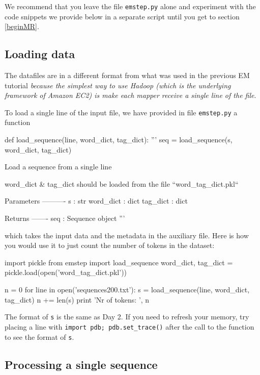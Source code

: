We recommend that you leave the file \verb+emstep.py+ alone and experiment with the code snippets we provide below in a separate script until you get to section \ref{beginMR}.

\subsection{Loading data}

The datafiles are in a different format from what was used in the previous EM
tutorial \emph{because the simplest way to use Hadoop (which is the underlying framework of Amazon EC2) is make each mapper
receive a single line of the file}.

To load a single line of the input file, we have provided in file {\texttt{emstep.py}} a function
\begin{python}
def load_sequence(line, word_dict, tag_dict):
    '''
    seq = load_sequence(s, word_dict, tag_dict)

    Load a sequence from a single line

    word_dict & tag_dict should be loaded from the file ``word_tag_dict.pkl``

    Parameters
    ----------
    s : str
    word_dict : dict
    tag_dict : dict

    Returns
    -------
    seq : Sequence object
    '''
\end{python}
which takes the
input data and the metadata in the auxiliary file. Here is how you would use it
to just count the number of tokens in the dataset:

\begin{python}
import pickle
from emstep import load_sequence
word_dict, tag_dict = pickle.load(open('word_tag_dict.pkl'))

n = 0
for line in open('sequences200.txt'):
    s = load_sequence(line, word_dict, tag_dict)
    n += len(s)
print 'Nr of tokens: ', n
\end{python}

The format of \texttt{s} is the same as Day 2. If you need to refresh your memory, try placing a line with \texttt{import pdb; pdb.set\_trace()} after the call to the function to see the format of \texttt{s}.

\subsection{Processing a single sequence}

